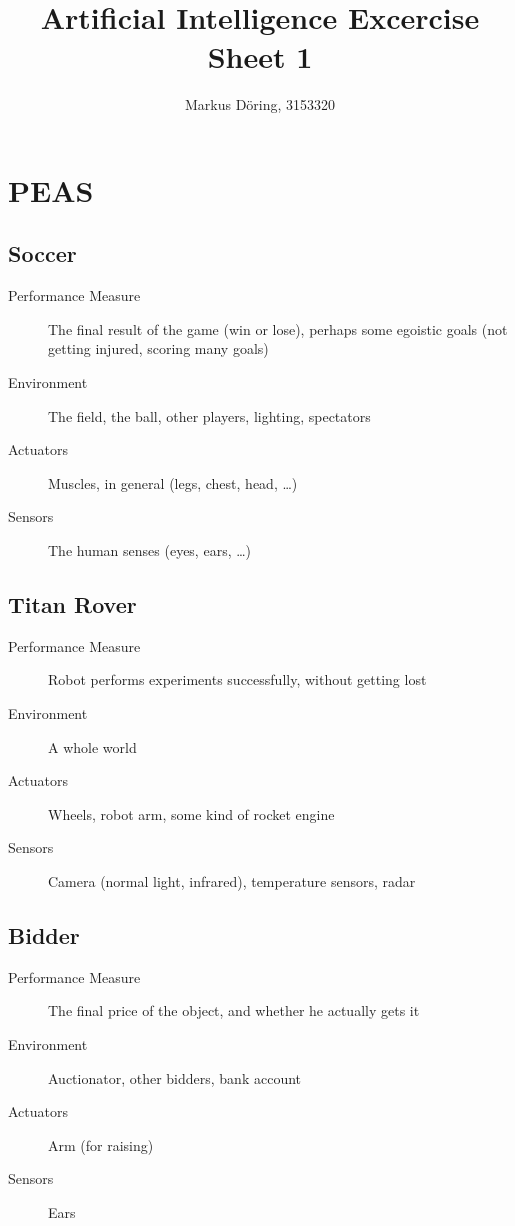 \documentclass[11pt,a4paper]{scrartcl}
\begin{document}
\title{Artificial Intelligence Excercise Sheet 1}
\author{Markus Döring, 3153320}
\maketitle

\section{PEAS}
\subsection{Soccer}
\begin{description}
 \item[Performance Measure] The final result of the game (win or lose), perhaps some egoistic goals (not getting injured, scoring many goals)
 \item[Environment] The field, the ball, other players, lighting, spectators
 \item[Actuators] Muscles, in general (legs, chest, head, \ldots)
 \item[Sensors] The human senses (eyes, ears, \ldots)
\end{description}
\subsection{Titan Rover}
\begin{description}
 \item[Performance Measure] Robot performs experiments successfully, without getting lost
 \item[Environment] A whole world
 \item[Actuators] Wheels, robot arm, some kind of rocket engine
 \item[Sensors] Camera (normal light, infrared), temperature sensors, radar
\end{description}
\subsection{Bidder}
\begin{description}
 \item[Performance Measure] The final price of the object, and whether he actually gets it
 \item[Environment] Auctionator, other bidders, bank account
 \item[Actuators] Arm (for raising)
 \item[Sensors] Ears
\end{description}
\end{document}
